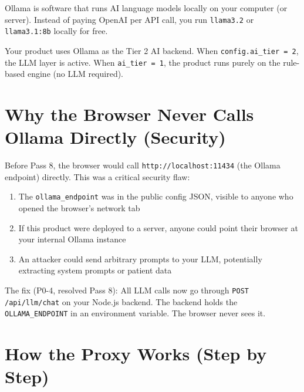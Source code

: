 \documentclass[12pt, a4paper]{report}
\newcommand{\ic}[1]{\texttt{\small\color{accentblue!70!black}#1}}
\begin{document}
Ollama is software that runs AI language models locally on your computer (or server).
Instead of paying OpenAI per API call, you run \ic{llama3.2} or \ic{llama3.1:8b}
locally for free.

Your product uses Ollama as the Tier 2 AI backend. When \ic{config.ai\_tier = 2}, the
LLM layer is active. When \ic{ai\_tier = 1}, the product runs purely on the rule-based
engine (no LLM required).

\section{Why the Browser Never Calls Ollama Directly (Security)}

Before Pass 8, the browser would call \ic{http://localhost:11434} (the Ollama endpoint)
directly. This was a critical security flaw:

\begin{enumerate}
  \item The \ic{ollama\_endpoint} was in the public config JSON, visible to anyone who
        opened the browser's network tab
  \item If this product were deployed to a server, anyone could point their browser at
        your internal Ollama instance
  \item An attacker could send arbitrary prompts to your LLM, potentially extracting
        system prompts or patient data
\end{enumerate}

The fix (P0-4, resolved Pass 8): All LLM calls now go through
\ic{POST /api/llm/chat} on your Node.js backend. The backend holds the
\ic{OLLAMA\_ENDPOINT} in an environment variable. The browser never sees it.

\section{How the Proxy Works (Step by Step)}
\end{document}
